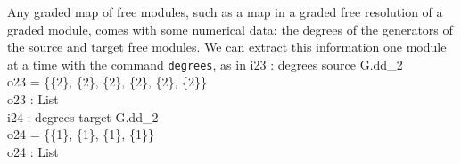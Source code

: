 Any graded map of free modules, such as a map in a graded
{}free resolution of a graded module, comes with some numerical data: 
the degrees of the 
generators of the source and target free modules.
We can extract this information one module at a time with
the command {\tt degrees}, as in
\beginOutput
i23 : degrees source G.dd_2\\
\emptyLine
o23 = \{\{2\}, \{2\}, \{2\}, \{2\}, \{2\}, \{2\}\}\\
\emptyLine
o23 : List\\
\endOutput
\beginOutput
i24 : degrees target G.dd_2\\
\emptyLine
o24 = \{\{1\}, \{1\}, \{1\}, \{1\}\}\\
\emptyLine
o24 : List\\
\endOutput

